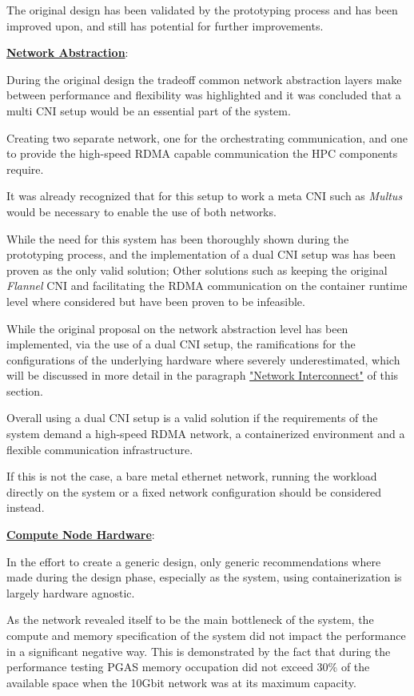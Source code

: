 The original design has been validated by the prototyping process and has been improved upon,
and still has potential for further improvements.

\textbf{\hyperref[asp:network_abstraction]{Network Abstraction}}:

During the original design the tradeoff common network abstraction layers make
between performance and flexibility was highlighted and it was concluded that a
multi \ac{CNI} setup would be an essential part of the system.

Creating two separate network, one for the orchestrating communication, and one
to provide the high-speed \ac{RDMA} capable communication the \ac{HPC} components
require.

It was already recognized that for this setup to work a meta \ac{CNI} such
as \textit{Multus} would be necessary to enable the use of both networks.

While the need for this system has been thoroughly shown during the prototyping process,
and the implementation of a dual \ac{CNI} setup was has been proven as the only valid solution;
Other solutions such as keeping the original \textit{Flannel} \ac{CNI} and
facilitating the \ac{RDMA} communication on the container runtime level where considered but
have been proven to be infeasible.

While the original proposal on the network abstraction level has been implemented, via
the use of a dual \ac{CNI} setup, the ramifications for the configurations of the underlying
hardware where severely underestimated, which will be discussed in more detail in the paragraph
\hyperref[par:network_interconnect]{"Network Interconnect"} of this section.

Overall using a dual \ac{CNI} setup is a valid solution if the requirements of the system
demand a high-speed \ac{RDMA} network, a containerized environment and a flexible communication
infrastructure.

If this is not the case, a bare metal ethernet network, running the workload directly on the system
or a fixed network configuration should be considered instead.

\textbf{\hyperref[asp:compute_node_hardware]{Compute Node Hardware}}:

In the effort to create a generic design, only generic recommendations where made
during the design phase, especially as the system, using containerization is
largely hardware agnostic.

As the network revealed itself to be the main bottleneck of the system, the
compute and memory specification of the system did not impact the performance
in a significant negative way.
This is demonstrated by the fact that during the performance testing \ac{PGAS}
memory occupation did not exceed 30\% of the available space when
the 10Gbit network was at its maximum capacity.

